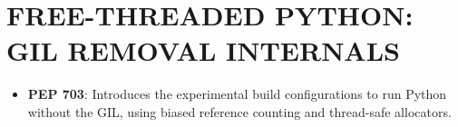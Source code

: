 \hypertarget{free-threaded-python-gil-removal-internals}{%
\chapter{FREE-THREADED PYTHON: GIL REMOVAL
INTERNALS}\label{free-threaded-python-gil-removal-internals}}

\begin{itemize}
\tightlist
\item
  \textbf{PEP 703}: Introduces the experimental build configurations to
  run Python without the GIL, using biased reference counting and
  thread-safe allocators.
\end{itemize}

